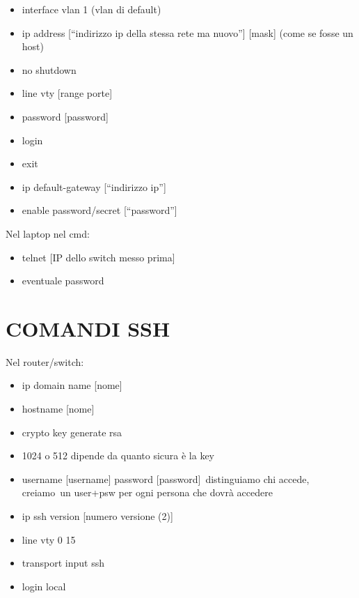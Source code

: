 \documentclass[
]{article}
\providecommand{\tightlist}{%
  \setlength{\itemsep}{0pt}\setlength{\parskip}{0pt}}
\begin{document}
\begin{itemize}
\tightlist
\item
  {interface vlan 1 (vlan di default)}
\item
  {ip address {[}``indirizzo ip della stessa rete ma nuovo''{]}
  {[}mask{]} (come se fosse un host)}
\item
  {no shutdown}
\item
  {line vty {[}range porte{]}}
\item
  {password {[}password{]}}
\item
  {login}
\item
  {exit}
\item
  {ip default-gateway {[}``indirizzo ip''{]}}
\item
  {enable password/secret {[}``password''{]}}{\hfill\break
  }
\end{itemize}

{Nel laptop nel cmd:}

\begin{itemize}
\tightlist
\item
  {telnet {[}IP dello switch messo prima{]}}
\item
  {eventuale password}
\end{itemize}

{}

\section{\texorpdfstring{{COMANDI
SSH}}{COMANDI SSH}}\label{h.cimyzss2yimp}

{Nel router/switch:}

\begin{itemize}
\tightlist
\item
  {ip domain name {[}nome{]}}
\item
  {hostname {[}nome{]}}
\item
  {crypto key generate rsa}
\item
  {1024 o 512 dipende da quanto sicura è la key}
\item
  {username {[}username{]} password {[}password{]}}{~}{distinguiamo chi
  accede, }{creiamo}{~un user+psw per ogni persona che dovrà accedere}
\item
  {ip ssh version {[}numero versione (2){]}}
\item
  {line vty 0 15}
\item
  {transport input ssh}
\item
  {login local}
\end{itemize}
\end{document}
